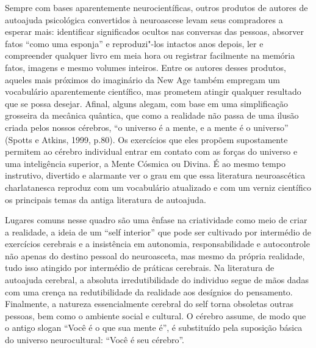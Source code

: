 Sempre com bases aparentemente neurocientíficas, outros produtos de
autores de autoajuda psicológica convertidos à neuroascese levam seus
compradores a esperar mais: identificar significados ocultos nas
conversas das pessoas, absorver fatos ``como uma esponja'' e
reproduzi"-los intactos anos depois, ler e compreender qualquer livro em
meia hora ou registrar facilmente na memória fatos, imagens e mesmo
volumes inteiros. Entre os autores desses produtos, aqueles mais
próximos do imaginário da New Age também empregam um vocabulário
aparentemente científico, mas prometem atingir qualquer resultado que se
possa desejar. Afinal, alguns alegam, com base em uma simplificação
grosseira da mecânica quântica, que como a realidade não passa de uma
ilusão criada pelos nossos cérebros, ``o universo é a mente, e a mente é
o universo'' (Spotts e Atkins, 1999, p.80). Os exercícios que eles
propõem supostamente permitem ao cérebro individual entrar em contato
com as forças do universo e uma inteligência superior, a Mente Cósmica
ou Divina. É ao mesmo tempo instrutivo, divertido e alarmante ver o grau
em que essa literatura neuroascética charlatanesca reproduz com um
vocabulário atualizado e com um verniz científico os principais temas da
antiga literatura de autoajuda.

Lugares comuns nesse quadro são uma ênfase na criatividade como meio de
criar a realidade, a ideia de um ``self interior'' que pode ser
cultivado por intermédio de exercícios cerebrais e a insistência em
autonomia, responsabilidade e autocontrole não apenas do destino pessoal
do neuroasceta, mas mesmo da própria realidade, tudo isso atingido por
intermédio de práticas cerebrais. Na literatura de autoajuda cerebral, a
absoluta irredutibilidade do individuo segue de mãos dadas com uma
crença na redutibilidade da realidade aos desígnios do pensamento.
Finalmente, a natureza essencialmente cerebral do self torna obsoletas
outras pessoas, bem como o ambiente social e cultural. O cérebro assume,
de modo que o antigo slogan ``Você é o que sua mente é'', é substituído
pela suposição básica do universo neurocultural: ``Você é seu cérebro''.

